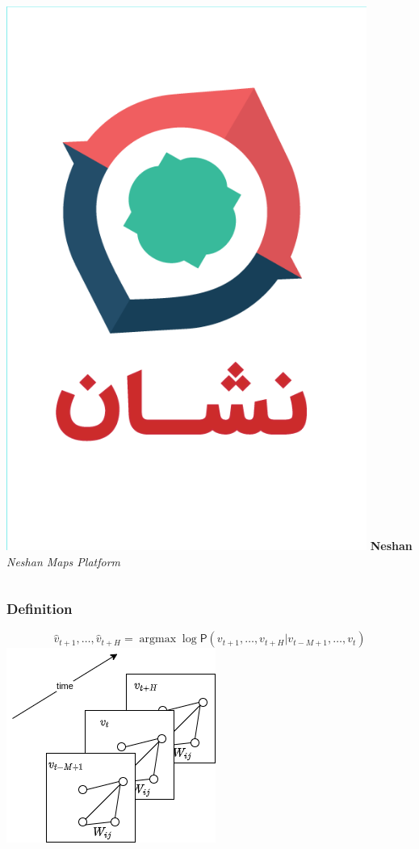\documentclass{beamer}
\begin{document}
\begin{frame}
\begin{columns}
		\includegraphics[height=0.5\textheight]{./img/neshan.png}
		\textbf{Neshan}\\
		\textit{Neshan Maps Platform}
	\end{columns}
\end{frame}
\begin{frame}
  \frametitle{Definition}
  \begin{equation}
    \label{eq:base}
    \hat{v}_{t+1}, \ldots,  \hat{v}_{t+H} = \mathop{\mathrm{argmax}} \log \mathsf{P}({v}_{t+1}, \ldots,  v_{t+H} | v_{t-M+1} , \ldots,  v_{t})
  \end{equation}
  \centering
  \includegraphics[height=.5\textheight]{img/base.png}
\end{frame}
\end{document}
